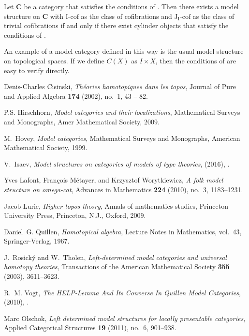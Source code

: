 \documentclass{tac}
\theoremstyle{definition}
\newcommand{\cat}[1]{\mathbf{#1}}
\newcommand{\C}{\cat{C}}
\newcommand{\I}{\mathrm{I}}
\newcommand{\J}{\mathrm{J}}
\newcommand{\class}[2]{#1\text{-}\mathrm{#2}}
\newcommand{\Icof}[1][\I]{\class{#1}{cof}}
\newcommand{\Jcof}[1][]{\Icof[\J#1]}
\begin{document}
\begin{cor}
Let $\C$ be a category that satisfies the conditions of .
Then there exists a model structure on $\C$ with $\Icof$ as the class of cofibrations and $\Jcof[_\I]$ as the class of trivial cofibrations
if and only if there exist cylinder objects that satisfy the conditions of .
\end{cor}

\begin{exmp}
An example of a model category defined in this way is the usual model structure on topological spaces.
If we define $C(X)$ as $I \times X$, then the conditions of  are easy to verify directly.
\end{exmp}

\begin{references*}

Denis-Charles Cisinski, \emph{Théories homotopiques dans les topos}, Journal
  of Pure and Applied Algebra \textbf{174} (2002), no.~1, 43 -- 82.

P.S. Hirschhorn, \emph{Model categories and their localizations}, Mathematical
  Surveys and Monographs, Amer Mathematical Society, 2009.

M.~Hovey, \emph{Model categories}, Mathematical Surveys and Monographs,
  American Mathematical Society, 1999.

V.~{Isaev}, \emph{Model structures on categories of models of type theories},
  (2016), \href {http://arxiv.org/abs/1607.07407} {}.

Yves Lafont, Fran{\c c}ois M{\'e}tayer, and Krzysztof Worytkiewicz, \emph{{A
  folk model structure on omega-cat}}, Advances in Mathematics \textbf{224}
  (2010), no.~3, 1183--1231.

Jacob Lurie, \emph{Higher topos theory}, Annals of mathematics studies,
  Princeton University Press, Princeton, N.J., Oxford, 2009.

Daniel~G. Quillen, \emph{Homotopical algebra}, Lecture Notes in Mathematics,
  vol.~43, Springer-Verlag, 1967.

J.~Rosick{\'y} and W.~Tholen, \emph{Left-determined model categories and
  universal homotopy theories}, Transactions of the American Mathematical
  Society \textbf{355} (2003), 3611--3623.

R.~M. Vogt, \emph{{The HELP-Lemma And Its Converse In Quillen Model
  Categories}},  (2010), \href {http://arxiv.org/abs/1004.5249}
  {}.

Marc Olschok, \emph{Left determined model structures for locally presentable
  categories}, Applied Categorical Structures \textbf{19} (2011), no.~6,
  901--938.

\end{references*}
\end{document}
